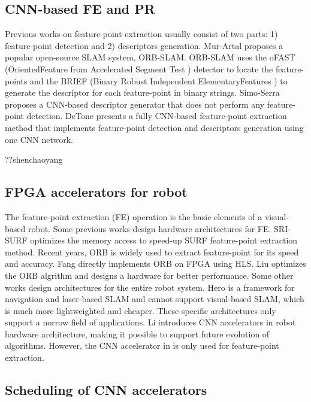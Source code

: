 \label{sec:relate}
\subsection{ CNN-based FE and PR }

Previous works on feature-point extraction usually consist of two parts: 1) feature-point detection and 2) descriptors generation.
Mur-Artal \cite{Mur-Artal:2017281} proposes a popular open-source SLAM system, ORB-SLAM. ORB-SLAM uses the oFAST (OrientedFeature from Accelerated Segment Test \cite{biadgie2014feature}) detector to locate the feature-points and the BRIEF (Binary Robust Independent ElementaryFeatures \cite{calonder2010brief}) to generate the descriptor for each feature-point in binary strings. 
Simo-Serra \cite{simo2015discriminative} proposes a CNN-based descriptor generator that does not perform any feature-point detection. 
DeTone \cite{detone2018superpoint} presents a fully CNN-based feature-point extraction method that implements feature-point detection and descriptors generation using one CNN network.

??shenchaoyang

\subsection{ FPGA accelerators for robot }

The feature-point extraction (FE) operation is the basic elements of a visual-based robot.
Some previous works design hardware architectures for FE.
SRI-SURF \cite{jia2016sri} optimizes the memory access to speed-up SURF \cite{bay2006surf} feature-point extraction method. Recent years, ORB is widely used to extract feature-point for its speed and accuracy. 
Fang \cite{fang2017fpga} directly implements ORB on FPGA using HLS. Liu \cite{liu2019eslam} optimizes the ORB algrithm and designs a hardware for better performance.
Some other works design architectures for the entire robot system. Hero \cite{shi2018hero} is a framework for navigation and laser-based SLAM and cannot support visual-based SLAM, which is much more lightweighted and cheaper. These specific architectures only support a norrow field of applications. 
Li \cite{li2019879gops} introduces CNN accelerators in robot hardware architecture, making it possible to support future evolution of algorithms. However, the CNN accelerator in \cite{li2019879gops} is only used for feature-point extraction.

\subsection{ Scheduling of CNN accelerators }

